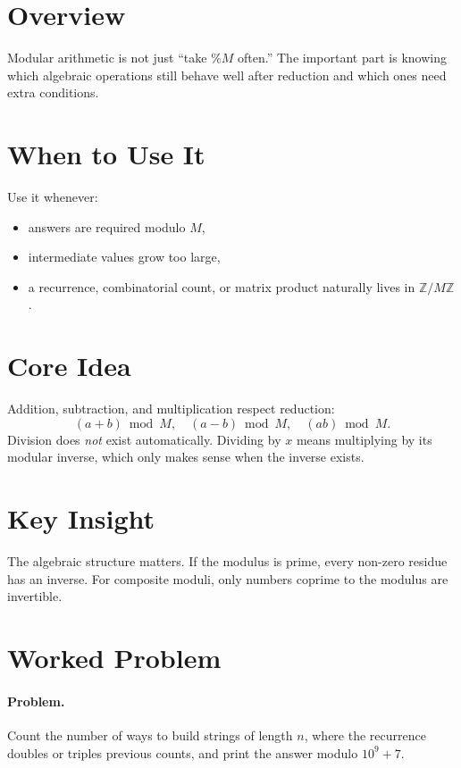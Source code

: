 \section*{Overview}

Modular arithmetic is not just ``take \(\% M\) often.'' The important part is knowing which algebraic operations still
behave well after reduction and which ones need extra conditions.

\section*{When to Use It}

Use it whenever:

\begin{itemize}
  \item answers are required modulo \(M\),
  \item intermediate values grow too large,
  \item a recurrence, combinatorial count, or matrix product naturally lives in \(\mathbb{Z}/M\mathbb{Z}\).
\end{itemize}

\section*{Core Idea}

Addition, subtraction, and multiplication respect reduction:
\[
(a+b)\bmod M,\quad (a-b)\bmod M,\quad (ab)\bmod M.
\]
Division does \emph{not} exist automatically. Dividing by \(x\) means multiplying by its modular inverse, which only
makes sense when the inverse exists.

\section*{Key Insight}

The algebraic structure matters. If the modulus is prime, every non-zero residue has an inverse. For composite moduli,
only numbers coprime to the modulus are invertible.

\section*{Worked Problem}

\paragraph{Problem.}
Count the number of ways to build strings of length \(n\), where the recurrence doubles or triples previous counts, and
print the answer modulo \(10^9+7\).


